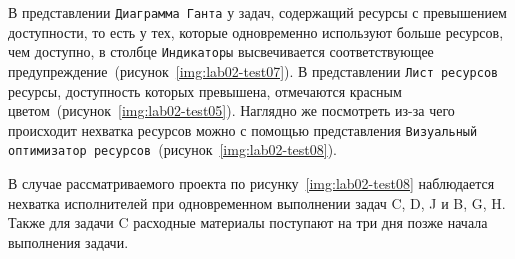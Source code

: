 В представлении \texttt{Диаграмма Ганта} у задач, содержащий ресурсы с
превышением доступности, то есть у тех, которые одновременно используют больше
ресурсов, чем доступно, в столбце \texttt{Индикаторы} высвечивается
соответствующее предупреждение~(рисунок~\ref{img:lab02-test07}). В
представлении \texttt{Лист ресурсов} ресурсы, доступность которых превышена,
отмечаются красным цветом~(рисунок~\ref{img:lab02-test05}). Наглядно же
посмотреть из-за чего происходит нехватка ресурсов можно с помощью
представления \texttt{Визуальный оптимизатор ресурсов}~(рисунок~\ref{img:lab02-test08}). 


В случае рассматриваемого проекта по рисунку~\ref{img:lab02-test08} наблюдается
нехватка исполнителей при одновременном выполнении задач C, D, J и B, G, H.
Также для задачи C расходные материалы поступают на три дня позже начала
выполнения задачи.
